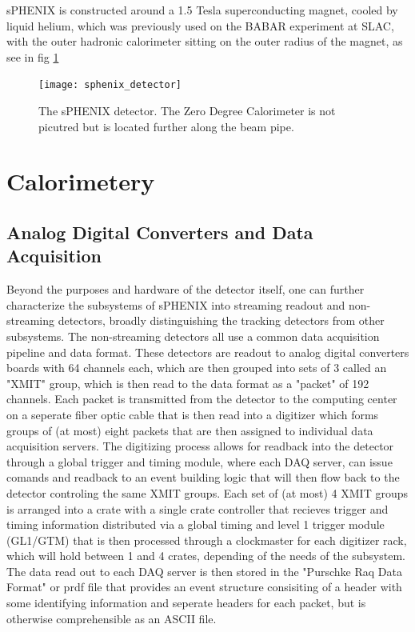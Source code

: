 \documentclass[letterpaper, 12pt, oneside]{book}
\theoremstyle{definition}
\begin{document}
sPHENIX is constructed around a 1.5 Tesla superconducting magnet, cooled by liquid helium, which was previously used on the BABAR experiment at SLAC, with the outer hadronic calorimeter sitting on the outer radius of the magnet, as see in fig \ref{fig:sphenix_detector}
\begin{figure}
	\texttt{[image: sphenix\_detector]}
	\caption{The sPHENIX detector. The Zero Degree Calorimeter is not picutred but is located further along the beam pipe.}
	\label{fig:sphenix_detector}
\end{figure}
\section{Calorimetery}
	\subsection{Analog Digital Converters and Data Acquisition}
		Beyond the purposes and hardware of the detector itself, one can further characterize the subsystems of sPHENIX into streaming readout and non-streaming detectors, broadly distinguishing the tracking detectors from other subsystems. 
		The non-streaming detectors all use a common data acquisition pipeline and data format. 
		These detectors are readout to analog digital converters boards with 64 channels each, which are then grouped into sets of 3 called an "XMIT" group, which is then read to the data format as a "packet" of 192 channels. 
		Each packet is transmitted from the detector to the computing center on a seperate fiber optic cable that is then read into a digitizer which forms groups of (at most) eight packets that are then assigned to individual data acquisition servers. 
		The digitizing process allows for readback into the detector through a global trigger and timing module, where each DAQ server, can issue comands and readback to an event building logic that will then flow back to the detector controling the same XMIT groups. 
		Each set of (at most) 4 XMIT groups is arranged into a crate with a single crate controller that recieves trigger and timing information distributed via a global timing and level 1 trigger module (GL1/GTM) that is then processed through a clockmaster for each digitizer rack, which will hold between 1 and 4 crates, depending of the needs of the subsystem. 
		The data read out to each DAQ server is then stored in the "Purschke Raq Data Format" or prdf file that provides an event structure consisiting of a header with some identifying information and seperate headers for each packet, but is otherwise comprehensible as an ASCII file. 
\end{document}
